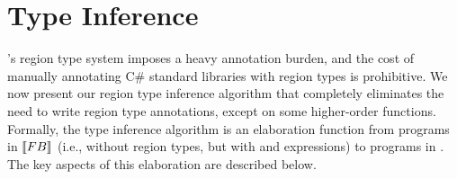 \section{Type Inference}
\label{sec:type-inference}

\name's region type system imposes a heavy annotation burden, and the
cost of manually annotating C\# standard libraries with region types
is prohibitive. We now present our region type inference algorithm
that completely eliminates the need to write region type annotations,
except on some higher-order functions. Formally, the type inference
algorithm is an elaboration function from programs in $\llbracket {\sc FB} \rrbracket$
(i.e., \FB without region types, but with  and 
expressions) to programs in \FB. The key aspects of this elaboration
are described below.

%

